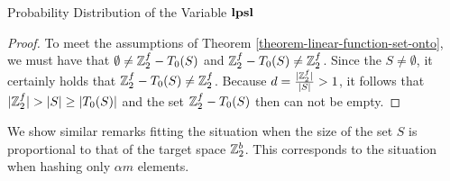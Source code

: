 \begin{section}{Probability Distribution of the Variable \texorpdfstring{$\mathbf{lpsl}$}{lpsl}}
\begin{proof}
To meet the assumptions of Theorem \ref{theorem-linear-function-set-onto}, we must have that $\emptyset \neq \mathbb{Z}_{2}^{f} - T_0(S)$ and $\mathbb{Z}_{2}^{f} - T_0(S) \neq \mathbb{Z}_{2}^{f}$. Since the $S \neq \emptyset$, it certainly holds that $\mathbb{Z}_{2}^{f} - T_0(S) \neq \mathbb{Z}_{2}^{f}$. Because $d = \frac{|\mathbb{Z}_{2}^{f}|}{|S|} > 1$, it follows that $|\mathbb{Z}_{2}^{f}| > |S| \geq |T_0(S)|$ and the set $\mathbb{Z}_{2}^{f} - T_0(S)$ then can not be empty.

%
%
%
\end{proof}

We show similar remarks fitting the situation when the size of the set $S$ is proportional to that of the target space $\mathbb{Z}_{2}^{b}$. This corresponds to the situation when hashing only $\alpha m$ elements.


\end{section}
